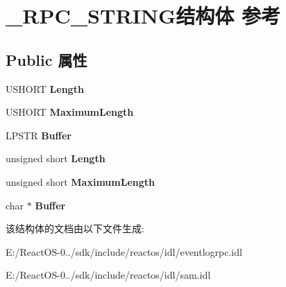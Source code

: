 \hypertarget{struct___r_p_c___s_t_r_i_n_g}{}\section{\+\_\+\+R\+P\+C\+\_\+\+S\+T\+R\+I\+N\+G结构体 参考}
\label{struct___r_p_c___s_t_r_i_n_g}
\subsection*{Public 属性}
\begin{DoxyCompactItemize}
\item 
\mbox{\label{struct___r_p_c___s_t_r_i_n_g_a15bf329b127fae3e4fbe9e6a64cb6b1e}} 
U\+S\+H\+O\+RT {\bfseries Length}
\item 
\mbox{\label{struct___r_p_c___s_t_r_i_n_g_a3037d808fed9324c8c54fa49be4adddb}} 
U\+S\+H\+O\+RT {\bfseries Maximum\+Length}
\item 
\mbox{\label{struct___r_p_c___s_t_r_i_n_g_a97ee652d3d8d52854b4b252355b0816c}} 
L\+P\+S\+TR {\bfseries Buffer}
\item 
\mbox{\label{struct___r_p_c___s_t_r_i_n_g_a40d40c7dc2fc12a3be6e9338cd4245e8}} 
unsigned short {\bfseries Length}
\item 
\mbox{\label{struct___r_p_c___s_t_r_i_n_g_aad8d2a038817901c58ab5364c1eb15db}} 
unsigned short {\bfseries Maximum\+Length}
\item 
\mbox{\label{struct___r_p_c___s_t_r_i_n_g_ac4eadc9a9ef4fde8f824b85c1a8689aa}} 
char $\ast$ {\bfseries Buffer}
\end{DoxyCompactItemize}


该结构体的文档由以下文件生成\+:\begin{DoxyCompactItemize}
\item 
E\+:/\+React\+O\+S-\/0../sdk/include/reactos/idl/eventlogrpc.\+idl\item 
E\+:/\+React\+O\+S-\/0../sdk/include/reactos/idl/sam.\+idl\end{DoxyCompactItemize}
